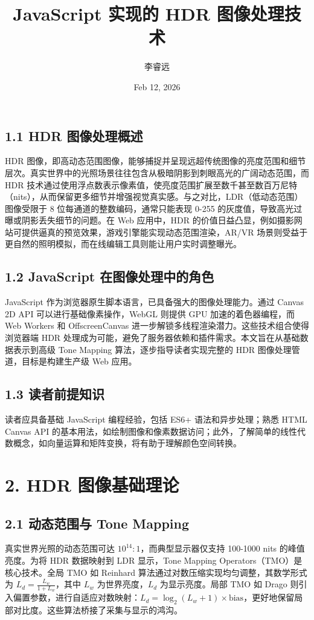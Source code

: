 \title{JavaScript 实现的 HDR 图像处理技术}
\author{李睿远}
\date{Feb 12, 2026}
\maketitle
\section{1.1 HDR 图像处理概述}
HDR 图像，即高动态范围图像，能够捕捉并呈现远超传统图像的亮度范围和细节层次。真实世界中的光照场景往往包含从极暗阴影到刺眼高光的广阔动态范围，而 HDR 技术通过使用浮点数表示像素值，使亮度范围扩展至数千甚至数百万尼特（nits），从而保留更多细节并增强视觉真实感。与之对比，LDR（低动态范围）图像受限于 8 位每通道的整数编码，通常只能表现 0-255 的灰度值，导致高光过曝或阴影丢失细节的问题。在 Web 应用中，HDR 的价值日益凸显，例如摄影网站可提供逼真的预览效果，游戏引擎能实现动态范围渲染，AR/VR 场景则受益于更自然的照明模拟，而在线编辑工具则能让用户实时调整曝光。\par
\section{1.2 JavaScript 在图像处理中的角色}
JavaScript 作为浏览器原生脚本语言，已具备强大的图像处理能力。通过 Canvas 2D API 可以进行基础像素操作，WebGL 则提供 GPU 加速的着色器编程，而 Web Workers 和 OffscreenCanvas 进一步解锁多线程渲染潜力。这些技术组合使得浏览器端 HDR 处理成为可能，避免了服务器依赖和插件需求。本文旨在从基础数据表示到高级 Tone Mapping 算法，逐步指导读者实现完整的 HDR 图像处理管道，目标是构建生产级 Web 应用。\par
\section{1.3 读者前提知识}
读者应具备基础 JavaScript 编程经验，包括 ES6+ 语法和异步处理；熟悉 HTML Canvas API 的基本用法，如绘制图像和像素数据访问；此外，了解简单的线性代数概念，如向量运算和矩阵变换，将有助于理解颜色空间转换。\par
\chapter{2. HDR 图像基础理论}
\section{2.1 动态范围与 Tone Mapping}
真实世界光照的动态范围可达 $10^{14}:1$，而典型显示器仅支持 100-1000 nits 的峰值亮度。为将 HDR 数据映射到 LDR 显示，Tone Mapping Operators（TMO）是核心技术。全局 TMO 如 Reinhard 算法通过对数压缩实现均匀调整，其数学形式为 $L_d = \frac{L_w}{1 + L_w}$，其中 $L_w$ 为世界亮度，$L_d$ 为显示亮度。局部 TMO 如 Drago 则引入偏置参数，进行自适应对数映射：$L_d = \log _2(L_w + 1) \times \text{bias}$，更好地保留局部对比度。这些算法桥接了采集与显示的鸿沟。\par
